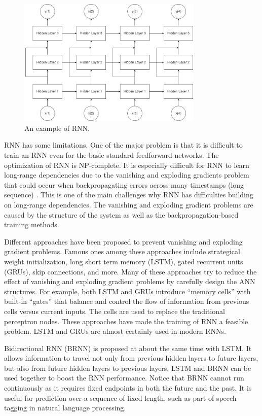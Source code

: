 \begin{figure}
	\centering
	\includegraphics[width=250pt]{chapters/part-6/figures/rnn_general.png}
	\caption{An example of RNN.} \label{ch:rnn:fig:rnn_general}
\end{figure}

RNN has some limitations. One of the major problem is that it is difficult to train an RNN even for the basic standard feedforward networks. The optimization of RNN is NP-complete. It is especially difficult for RNN to learn long-range dependencies due to the vanishing and exploding gradients problem that could occur when backpropagating errors across many timestamps (long sequence) \cite{lipton2015critical}. This is one of the main challenges why RNN has difficulties building on long-range dependencies. The vanishing and exploding gradient problems are caused by the structure of the system as well as the backpropagation-based training methods.

Different approaches have been proposed to prevent vanishing and exploding gradient problems. Famous ones among these approaches include strategical weight initialization, long short term memory (LSTM), gated recurrent units (GRUs), skip connections, and more. Many of these approaches try to reduce the effect of vanishing and exploding gradient problems by carefully design the ANN structures. For example, both LSTM and GRUs introduce ``memory cells'' with built-in ``gates'' that balance and control the flow of information from previous cells versus current inputs. The cells are used to replace the traditional perceptron nodes. These approaches have made the training of RNN a feasible problem. LSTM and GRUs are almost certainly used in modern RNNs.

Bidirectional RNN (BRNN) is proposed at about the same time with LSTM. It allows information to travel not only from previous hidden layers to future layers, but also from future hidden layers to previous layers. LSTM and BRNN can be used together to boost the RNN performance. Notice that BRNN cannot run continuously as it requires fixed endpoints in both the future and the past. It is useful for prediction over a sequence of fixed length, such as part-of-speech tagging in natural language processing.

